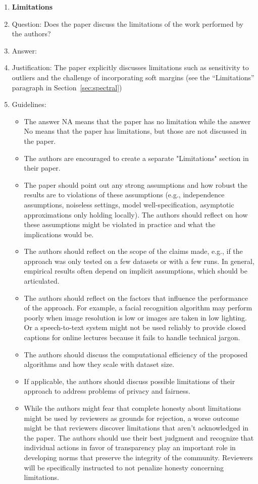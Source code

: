\documentclass{article}
\begin{document}
\begin{enumerate}
\item {\bf Limitations}
    \item[] Question: Does the paper discuss the limitations of the work performed by the authors?
    \item[] Answer: \answerYes{}
    \item[] Justification: The paper explicitly discusses limitations such as sensitivity to outliers and the challenge of incorporating soft margins (see the ``Limitations'' paragraph in Section~\ref{sec:spectral})
    \item[] Guidelines:
    \begin{itemize}
        \item The answer NA means that the paper has no limitation while the answer No means that the paper has limitations, but those are not discussed in the paper. 
        \item The authors are encouraged to create a separate "Limitations" section in their paper.
        \item The paper should point out any strong assumptions and how robust the results are to violations of these assumptions (e.g., independence assumptions, noiseless settings, model well-specification, asymptotic approximations only holding locally). The authors should reflect on how these assumptions might be violated in practice and what the implications would be.
        \item The authors should reflect on the scope of the claims made, e.g., if the approach was only tested on a few datasets or with a few runs. In general, empirical results often depend on implicit assumptions, which should be articulated.
        \item The authors should reflect on the factors that influence the performance of the approach. For example, a facial recognition algorithm may perform poorly when image resolution is low or images are taken in low lighting. Or a speech-to-text system might not be used reliably to provide closed captions for online lectures because it fails to handle technical jargon.
        \item The authors should discuss the computational efficiency of the proposed algorithms and how they scale with dataset size.
        \item If applicable, the authors should discuss possible limitations of their approach to address problems of privacy and fairness.
        \item While the authors might fear that complete honesty about limitations might be used by reviewers as grounds for rejection, a worse outcome might be that reviewers discover limitations that aren't acknowledged in the paper. The authors should use their best judgment and recognize that individual actions in favor of transparency play an important role in developing norms that preserve the integrity of the community. Reviewers will be specifically instructed to not penalize honesty concerning limitations.
    \end{itemize}


\end{enumerate}
\end{document}
